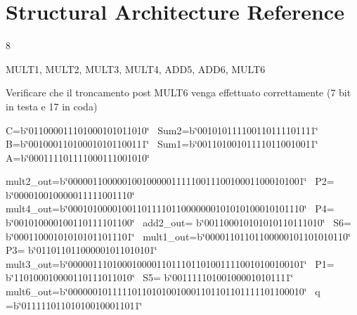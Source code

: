 \hypertarget{class_linear_regression_1_1_structural}{}\section{Structural Architecture Reference}
\label{class_linear_regression_1_1_structural}


8 

M\+U\+L\+T1, M\+U\+L\+T2, M\+U\+L\+T3, M\+U\+L\+T4, A\+D\+D5, A\+D\+D6, M\+U\+L\+T6 

Verificare che il troncamento post M\+U\+L\+T6 venga effettuato correttamente (7 bit in testa e 17 in coda) 

C=b\char`\"{}011000011101000101011010\char`\"{}~\newline
 Sum2=b\char`\"{}001010111100110111101111\char`\"{}~\newline
 B=b\char`\"{}001000110100010101100111\char`\"{}~\newline
 Sum1=b\char`\"{}001101001011110110010011\char`\"{}~\newline
 A=b\char`\"{}000111101111000111001010\char`\"{}  

mult2\+\_\+out=b\char`\"{}000001100000100100000111110011100100011000101001\char`\"{}~\newline
 P2= b\char`\"{}000010010000011111001110\char`\"{}~\newline
 mult4\+\_\+out=b\char`\"{}000101000010011011110110000000101010100010101110\char`\"{}~\newline
 P4= b\char`\"{}001010000100110111101100\char`\"{}~\newline
 add2\+\_\+out= b\char`\"{}001100010101010110111010\char`\"{}~\newline
 S6= b\char`\"{}000110001010101011011101\char`\"{}~\newline
 mult1\+\_\+out=b\char`\"{}00001101101100000101101010110\char`\"{}~\newline
 P3= b\char`\"{}011011011000001011010101\char`\"{}~\newline
 mult3\+\_\+out=b\char`\"{}000001110100010000110111011010011110010100100101\char`\"{}~\newline
 P1= b\char`\"{}110100010000110111011010\char`\"{}~\newline
 S5= b\char`\"{}001111101001000010101111\char`\"{}~\newline
 mult6\+\_\+out=b\char`\"{}000000101111101101010010001101101101111101100010\char`\"{}~\newline
 q =b\char`\"{}011111011010100100011011\char`\"{}  

